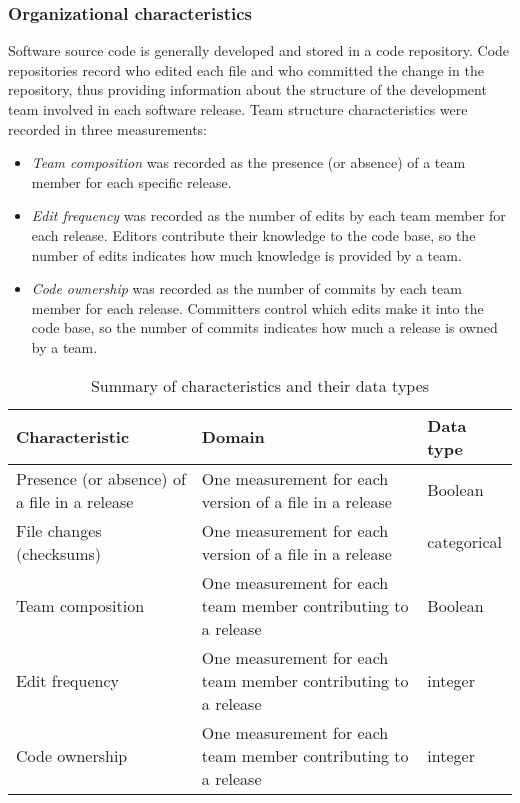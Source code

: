 \subsubsection{Organizational characteristics}
Software source code is generally developed and stored in a code repository. Code repositories record who edited each file and who committed the change in the repository, thus providing information about the structure of the development team involved in each software release. Team structure characteristics were recorded in three measurements:

\begin{itemize}
\item{\textit{Team composition} was recorded as the presence (or absence) of a team member for each specific release.}
  
\item{\textit{Edit frequency} was recorded as the number of edits by each team member for each release. Editors contribute their knowledge to the code base, so the number of edits indicates how much knowledge is provided by a team.}

\item{\textit{Code ownership} was recorded as the number of commits by each team member for each release. Committers control which edits make it into the code base, so the number of commits indicates how much a release is owned by a team.}
\end{itemize}

\begin{table}[H]
\caption{Summary of characteristics and their data types}
\label{table:characteristics} 
\centering
\begin{tabu} to 
  \toprule
  Characteristic & Domain & Data type \\
  \midrule
  Presence (or absence) of a file in a release &
  One measurement for each version of a file in a release &
  Boolean \\
  \midrule
  File changes (checksums) &
  One measurement for each version of a file in a release &
  categorical \\
  \midrule
  Team composition &
  One measurement for each team member contributing to a release &
  Boolean \\
  \midrule
  Edit frequency &
  One measurement for each team member contributing to a release &
  integer \\
  \midrule
  Code ownership &
  One measurement for each team member contributing to a release &
  integer \\
\bottomrule
\end{tabu}
\end{table}

